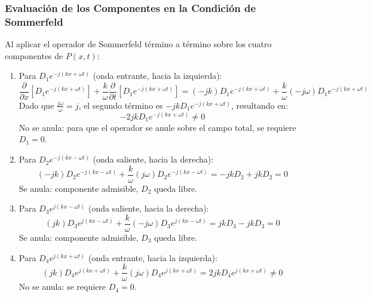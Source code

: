 \documentclass[11pt,letterpaper]{article}
\begin{document}
\subsubsection{Evaluación de los Componentes en la Condición de Sommerfeld}
Al aplicar el operador de Sommerfeld término a término sobre los cuatro componentes de $P(x,t)$:
\begin{enumerate}
    \item Para $D_1 e^{-j(kx + \omega t)}$ (onda entrante, hacia la izquierda):
    \begin{equation}
        \frac{\partial}{\partial x}\left[D_1 e^{-j(kx+\omega t)}\right] + \frac{k}{\omega}\frac{\partial}{\partial t}\left[D_1 e^{-j(kx+\omega t)}\right] = (-jk)D_1 e^{-j(kx+\omega t)} + \frac{k}{\omega}(-j\omega)D_1 e^{-j(kx+\omega t)}
    \end{equation}
    Dado que $\frac{j\omega}{\omega} = j$, el segundo término es $-jk D_1 e^{-j(kx+\omega t)}$, resultando en:
    \begin{equation}
        -2jk D_1 e^{-j(kx+\omega t)} \neq 0
    \end{equation}
    No se anula: para que el operador se anule sobre el campo total, se requiere $D_1 = 0$.

    \item Para $D_2 e^{-j(kx - \omega t)}$ (onda saliente, hacia la derecha):
    \begin{equation}
        (-jk)D_2 e^{-j(kx-\omega t)} + \frac{k}{\omega}(j\omega)D_2 e^{-j(kx-\omega t)} = -jk D_2 + jk D_2 = 0
    \end{equation}
    Se anula: componente admisible, $D_2$ queda libre.

    \item Para $D_3 e^{j(kx - \omega t)}$ (onda saliente, hacia la derecha):
    \begin{equation}
        (jk)D_3 e^{j(kx-\omega t)} + \frac{k}{\omega}(-j\omega)D_3 e^{j(kx-\omega t)} = jk D_3 - jk D_3 = 0
    \end{equation}
    Se anula: componente admisible, $D_3$ queda libre.

    \item Para $D_4 e^{j(kx + \omega t)}$ (onda entrante, hacia la izquierda):
    \begin{equation}
        (jk)D_4 e^{j(kx+\omega t)} + \frac{k}{\omega}(j\omega)D_4 e^{j(kx+\omega t)} = 2jk D_4 e^{j(kx+\omega t)} \neq 0
    \end{equation}
    No se anula: se requiere $D_4 = 0$.
\end{enumerate}
\end{document}
